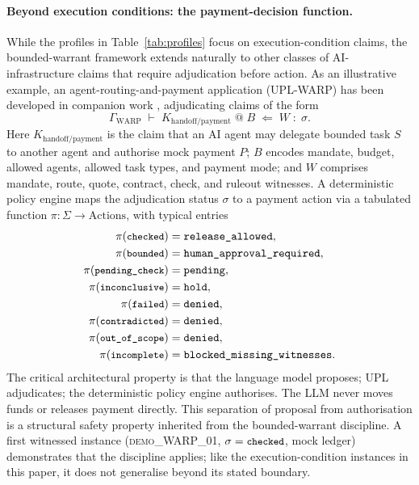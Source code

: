 \documentclass[11pt, a4paper]{article}
\theoremstyle{upldef}
\newcommand{\statuslabel}[1]{\texttt{\small #1}}
\begin{document}
\paragraph{Beyond execution conditions: the payment-decision function.}
While the profiles in Table~\ref{tab:profiles} focus on
execution-condition claims, the bounded-warrant framework extends
naturally to other classes of AI-infrastructure claims that require
adjudication before action. As an illustrative example, an
agent-routing-and-payment application (UPL-WARP) has been developed
in companion work \citep{vasen2026warp}, adjudicating claims of the
form
\[
\Gamma_{\text{WARP}} \;\vdash\;
K_{\text{handoff/payment}} \;@\; B
\;\Leftarrow\;
W \;:\; \sigma.
\]
Here $K_{\text{handoff/payment}}$ is the claim that an AI agent
may delegate bounded task $S$ to another agent and authorise
mock payment $P$; $B$ encodes mandate, budget, allowed agents,
allowed task types, and payment mode; and $W$ comprises mandate,
route, quote, contract, check, and ruleout witnesses. A
deterministic policy engine maps the adjudication status $\sigma$
to a payment action via a tabulated function $\pi: \Sigma \to
\mathrm{Actions}$, with typical entries
\begin{align*}
\pi(\statuslabel{checked})       &= \texttt{release\_allowed}, \\
\pi(\statuslabel{bounded})       &= \texttt{human\_approval\_required}, \\
\pi(\statuslabel{pending\_check})&= \texttt{pending}, \\
\pi(\statuslabel{inconclusive})  &= \texttt{hold}, \\
\pi(\statuslabel{failed})        &= \texttt{denied}, \\
\pi(\statuslabel{contradicted})  &= \texttt{denied}, \\
\pi(\statuslabel{out\_of\_scope})&= \texttt{denied}, \\
\pi(\statuslabel{incomplete})    &= \texttt{blocked\_missing\_witnesses}.
\end{align*}
The critical architectural property is that the language model
proposes; UPL adjudicates; the deterministic policy engine
authorises. The LLM never moves funds or releases payment directly.
This separation of proposal from authorisation is a structural
safety property inherited from the bounded-warrant discipline. A
first witnessed instance (\textsc{demo\_WARP\_01}, $\sigma =
\statuslabel{checked}$, mock ledger) demonstrates that the
discipline applies; like the execution-condition instances in this
paper, it does not generalise beyond its stated boundary.
\end{document}

